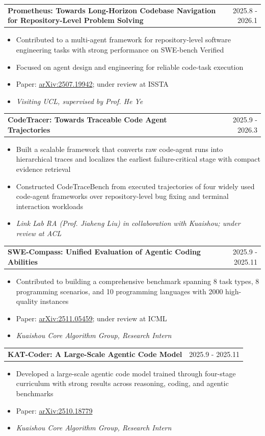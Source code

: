 \documentclass[a4paper,12pt]{article}
\makeatletter
\newenvironment{joblong}[2]
    {
    \begin{tabularx}{\linewidth}{@{}X r@{}}
    \textbf{#1} & #2 \\[3.75pt]
    \end{tabularx}
    \begin{minipage}[t]{\linewidth}
    \begin{itemize}[nosep,after=\strut, leftmargin=1em, itemsep=3pt,label=--]
    }
    {
    \end{itemize}
    \end{minipage}    
    }
\makeatother
\begin{document}
\begin{joblong}{Prometheus: Towards Long-Horizon Codebase Navigation for Repository-Level Problem Solving}{2025.8 - 2026.1}
\item Contributed to a multi-agent framework for repository-level software engineering tasks with strong performance on SWE-bench Verified
\item Focused on agent design and engineering for reliable code-task execution
\item Paper: \href{https://arxiv.org/abs/2507.19942}{arXiv:2507.19942}; under review at ISSTA
\item \textit{Visiting UCL, supervised by Prof. He Ye}
\end{joblong}

\begin{joblong}{CodeTracer: Towards Traceable Code Agent Trajectories}{2025.9 - 2026.3}
\item Built a scalable framework that converts raw code-agent runs into hierarchical traces and localizes the earliest failure-critical stage with compact evidence retrieval
\item Constructed CodeTraceBench from executed trajectories of four widely used code-agent frameworks over repository-level bug fixing and terminal interaction workloads
\item \textit{Link Lab RA (Prof. Jiaheng Liu) in collaboration with Kuaishou; under review at ACL}
\end{joblong}

\begin{joblong}{SWE-Compass: Unified Evaluation of Agentic Coding Abilities}{2025.9 - 2025.11}
\item Contributed to building a comprehensive benchmark spanning 8 task types, 8 programming scenarios, and 10 programming languages with 2000 high-quality instances
\item Paper: \href{https://arxiv.org/abs/2511.05459}{arXiv:2511.05459}; under review at ICML
\item \textit{Kuaishou Core Algorithm Group, Research Intern}
\end{joblong}

\begin{joblong}{KAT-Coder: A Large-Scale Agentic Code Model}{2025.9 - 2025.11}
\item Developed a large-scale agentic code model trained through four-stage curriculum with strong results across reasoning, coding, and agentic benchmarks
\item Paper: \href{https://arxiv.org/abs/2510.18779}{arXiv:2510.18779}
\item \textit{Kuaishou Core Algorithm Group, Research Intern}
\end{joblong}

\vfill
{}
\end{document}
